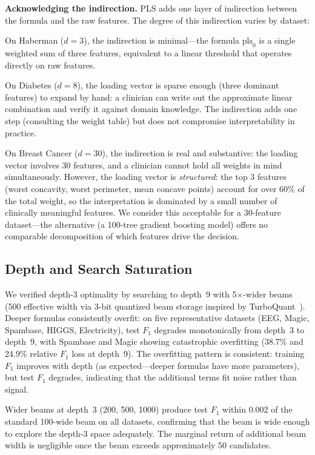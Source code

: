 \documentclass[journal]{IEEEtran}
\begin{document}
\textbf{Acknowledging the indirection.}
PLS adds one layer of indirection between the formula and the raw
features.  The degree of this indirection varies by dataset:

On Haberman ($d = 3$), the indirection is minimal---the formula $\mathrm{pls}_0$ is a single weighted sum of three features, equivalent to a linear threshold that operates
directly on raw features.

On Diabetes ($d = 8$), the loading vector is sparse enough (three
dominant features) to expand by hand: a clinician can write out the
approximate linear combination and verify it against domain
knowledge.  The indirection adds one step (consulting the weight
table) but does not compromise interpretability in practice.

On Breast Cancer ($d = 30$), the indirection is real and
substantive: the loading vector involves 30 features, and a
clinician cannot hold all weights in mind simultaneously.  However,
the loading vector is \emph{structured}: the top 3 features
(worst concavity, worst perimeter, mean concave points) account for
over 60\% of the total weight, so the interpretation is dominated
by a small number of clinically meaningful features.  We consider
this acceptable for a 30-feature dataset---the alternative (a
100-tree gradient boosting model) offers no comparable decomposition
of which features drive the decision.

\subsection{Depth and Search Saturation}
\label{sec:depth}

We verified depth-3 optimality by searching to depth~9 with
5$\times$-wider beams (500 effective width via 3-bit quantized beam
storage inspired by TurboQuant~\cite{zandieh2026turboquant}).
Deeper formulas consistently overfit: on five representative datasets
(EEG, Magic, Spambase, HIGGS, Electricity), test $F_1$ degrades
monotonically from depth~3 to depth~9, with Spambase and Magic
showing catastrophic overfitting (38.7\% and 24.9\% relative $F_1$
loss at depth~9).  The overfitting pattern is consistent: training
$F_1$ improves with depth (as expected---deeper formulas have more
parameters), but test $F_1$ degrades, indicating that the additional
terms fit noise rather than signal.

Wider beams at depth~3 (200, 500, 1000) produce test $F_1$ within
0.002 of the standard 100-wide beam on all datasets, confirming
that the beam is wide enough to explore the depth-3 space
adequately.  The marginal return of additional beam width is
negligible once the beam exceeds approximately 50 candidates.
\end{document}
